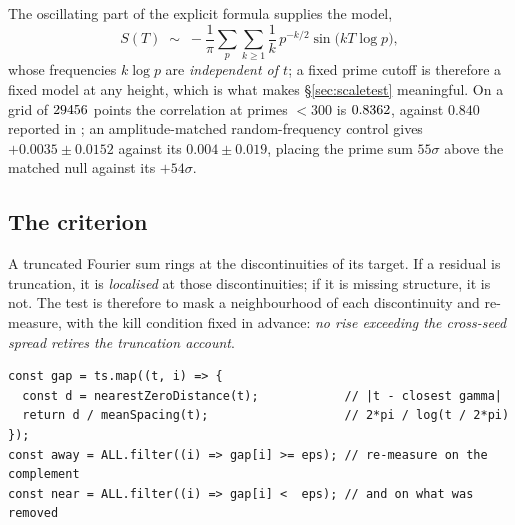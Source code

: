 \documentclass[11pt]{article}
\theoremstyle{remark}
\begin{document}
The oscillating part of the explicit formula supplies the model,
\begin{equation}\label{eq:explicit}
  S(T)\;\sim\;-\frac{1}{\pi}\sum_p\sum_{k\ge1}\frac1k\,p^{-k/2}\sin\!\bigl(kT\log p\bigr),
\end{equation}
whose frequencies $k\log p$ are \emph{independent of $t$}; a fixed prime cutoff is
therefore a fixed model at any height, which is what makes \S\ref{sec:scaletest}
meaningful. On a grid of $29456$ points the correlation at primes ${<}300$ is
$0.8362$, against $0.840$ reported in \cite{threelayer}; an amplitude-matched
random-frequency control gives $+0.0035\pm0.0152$ against its $0.004\pm0.019$, placing
the prime sum $55\sigma$ above the matched null against its $+54\sigma$.

\subsection{The criterion}

A truncated Fourier sum rings at the discontinuities of its target. If a residual is
truncation, it is \emph{localised} at those discontinuities; if it is missing structure,
it is not. The test is therefore to mask a neighbourhood of each discontinuity and
re-measure, with the kill condition fixed in advance: \emph{no rise exceeding the
cross-seed spread retires the truncation account}.

\begin{lstlisting}[caption={The mask. Distance to the nearest step is measured in \emph{local} mean spacings, since the density of zeros grows with height.},label={lst:mask}]
const gap = ts.map((t, i) => {
  const d = nearestZeroDistance(t);            // |t - closest gamma|
  return d / meanSpacing(t);                   // 2*pi / log(t / 2*pi)
});
const away = ALL.filter((i) => gap[i] >= eps); // re-measure on the complement
const near = ALL.filter((i) => gap[i] <  eps); // and on what was removed
\end{lstlisting}
\end{document}
